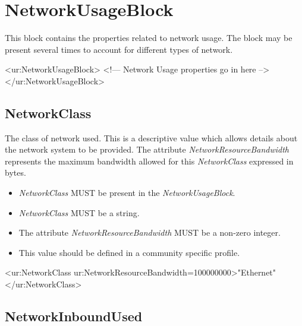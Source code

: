 
\section{NetworkUsageBlock}

This block contains the properties related to network usage. The block may be present several times to account for different types of network.

\begin{XMLexample}
<ur:NetworkUsageBlock>
<!— Network Usage properties go in here -->
</ur:NetworkUsageBlock>
\end{XMLexample}






\subsection{NetworkClass}

The class of network used.
This is a descriptive value which allows details about the network system to be provided. The attribute \emph{NetworkResourceBandwidth} represents the maximum bandwidth allowed for this \emph{NetworkClass} expressed in bytes.

\begin{itemize}
\item \emph{NetworkClass} MUST be present in the \emph{NetworkUsageBlock}.
\item \emph{NetworkClass} MUST be a string.
\item The attribute \emph{NetworkResourceBandwidth} MUST be a non-zero integer.
\item This value should be defined in a community specific profile.
\end{itemize}

\begin{XMLexample}
<ur:NetworkClass ur:NetworkResourceBandwidth=100000000>"Ethernet"</ur:NetworkClass>
\end{XMLexample}






\subsection{NetworkInboundUsed}

